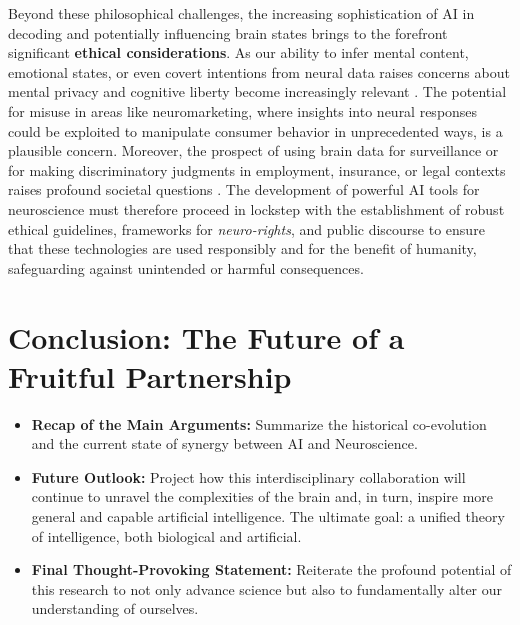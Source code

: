 Beyond these philosophical challenges, the increasing sophistication of AI in decoding and potentially influencing brain states brings to the forefront significant \textbf{ethical considerations}. As our ability to infer mental content, emotional states, or even covert intentions from neural data raises concerns about mental privacy and cognitive liberty become increasingly relevant \cite{richards2019deep}. The potential for misuse in areas like neuromarketing, where insights into neural responses could be exploited to manipulate consumer behavior in unprecedented ways, is a plausible concern. Moreover, the prospect of using brain data for surveillance or for making discriminatory judgments in employment, insurance, or legal contexts raises profound societal questions \cite{miller2019explanation}. The development of powerful AI tools for neuroscience must therefore proceed in lockstep with the establishment of robust ethical guidelines, frameworks for \textit{neuro-rights}, and public discourse to ensure that these technologies are used responsibly and for the benefit of humanity, safeguarding against unintended or harmful consequences.

\section{Conclusion: The Future of a Fruitful Partnership}
\begin{itemize}
    \item \textbf{Recap of the Main Arguments:} Summarize the historical co-evolution and the current state of synergy between AI and Neuroscience.
    \item \textbf{Future Outlook:} Project how this interdisciplinary collaboration will continue to unravel the complexities of the brain and, in turn, inspire more general and capable artificial intelligence. The ultimate goal: a unified theory of intelligence, both biological and artificial.
    \item \textbf{Final Thought-Provoking Statement:} Reiterate the profound potential of this research to not only advance science but also to fundamentally alter our understanding of ourselves.
\end{itemize}

\clearpage